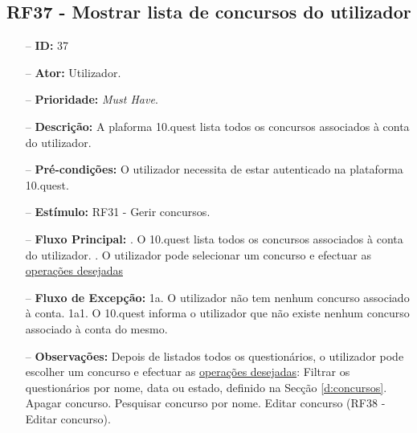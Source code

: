 \subsection{RF37 - Mostrar lista de concursos do utilizador}
\begin{itemize}
	\item[--] \textbf{ID:} 37
	\item[--]  \textbf{Ator:} Utilizador.
	\item[--]  \textbf{Prioridade:} \textit{Must Have}.
	\item[--]  \textbf{Descrição:} A plaforma 10.quest lista todos os concursos associados à conta do utilizador.
	\item[--]  \textbf{Pré-condições:} O utilizador necessita de estar autenticado na plataforma 10.quest.
	\item[--]  \textbf{Estímulo:} RF31 - Gerir concursos.
	\item[--]  \textbf{Fluxo Principal:} 
	. O 10.quest lista todos os concursos associados à conta do utilizador.
	. O utilizador pode selecionar um concurso e efectuar as \underline{operações desejadas}
	\item[--]  \textbf{Fluxo de Excepção:} 
	\subitem 1a. O utilizador não tem nenhum concurso associado à conta.
	\subitem 1a1. O 10.quest informa o utilizador que não existe nenhum concurso  associado à conta do mesmo.
	\item[--]  \textbf{Observações:} Depois de listados todos os questionários, o utilizador pode escolher um concurso e efectuar as \underline{operações desejadas}:
	\subitem Filtrar os questionários por nome, data ou estado, definido na Secção \ref{d:concursos}.
	\subitem Apagar concurso.
	\subitem Pesquisar concurso por nome.
	\subitem Editar concurso (RF38 - Editar concurso).
\end{itemize}
\newpage

